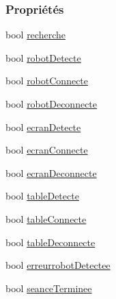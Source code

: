 \subsubsection*{Propriétés}
\begin{DoxyCompactItemize}
\item 
bool \hyperlink{class_fenetre_accueil_a7f19d53208fbb8a710d99e35a159e6f6}{recherche}
\item 
bool \hyperlink{class_fenetre_accueil_ab0b43c942d97c2dc0d9959ca169e8bec}{robot\+Detecte}
\item 
bool \hyperlink{class_fenetre_accueil_a54ee769329e57ec3cc914929a374d10e}{robot\+Connecte}
\item 
bool \hyperlink{class_fenetre_accueil_ab8211b4172be02065fd5ea980269ed74}{robot\+Deconnecte}
\item 
bool \hyperlink{class_fenetre_accueil_a6d857bdcea122b1a3810f1b2b3cf9806}{ecran\+Detecte}
\item 
bool \hyperlink{class_fenetre_accueil_a7ea800d5ace3059cba201be7616b4c91}{ecran\+Connecte}
\item 
bool \hyperlink{class_fenetre_accueil_ae1c22916e21b9218eee2d343787e1bbd}{ecran\+Deconnecte}
\item 
bool \hyperlink{class_fenetre_accueil_af1414772143899204bf91d030fcc54eb}{table\+Detecte}
\item 
bool \hyperlink{class_fenetre_accueil_a4a42fccfc8f6129d3030890d64db8200}{table\+Connecte}
\item 
bool \hyperlink{class_fenetre_accueil_a53e2fa830e6d693f2e6f58996b9b0371}{table\+Deconnecte}
\item 
bool \hyperlink{class_fenetre_accueil_a9d07d986583e8f6ff4250e869dba59a6}{erreurrobot\+Detectee}
\item 
bool \hyperlink{class_fenetre_accueil_a38fe2486fdfcb8c9fe1948685e85df71}{seance\+Terminee}
\end{DoxyCompactItemize}
